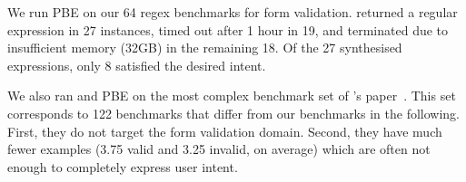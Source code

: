 \begin{figure}
\end{figure}


We run \Regel{} PBE on our 64 regex benchmarks for form validation.
%
\Regel{} returned a regular expression in 27 instances, timed out after 1 hour in 19, and terminated due to insufficient memory (32GB) in the remaining 18. Of the 27 synthesised expressions, only 8 satisfied the desired intent.

We also ran \Forest{} and \Regel{} PBE on the most complex benchmark set of \Regel's paper~\cite{Regel20}. This set corresponds to 122 benchmarks that differ from our benchmarks in the following. First, they do not target the form validation domain. Second, they have much fewer examples (3.75 valid and 3.25 invalid, on average) which are often not enough to completely express user intent. 

